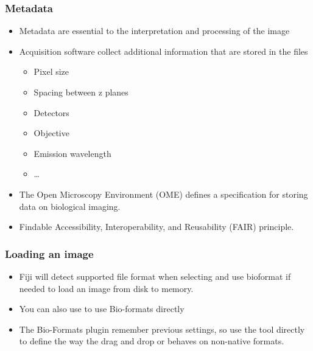 \documentclass[ignorenonframetext,aspectratio=169,10pt,xcolor=table]{beamer}
\begin{document}
\begin{frame} \frametitle{Metadata}
  \begin {itemize}
  \item Metadata are essential to the interpretation and processing of
    the image
  \item Acquisition software collect additional information that are
    stored in the files
    \begin{itemize}
    \item Pixel size
    \item Spacing between z planes
    \item Detectors
    \item Objective
    \item Emission wavelength
    \item \dots
    \end{itemize}
  \item The Open Microscopy Environment (OME) defines a specification
    for storing data on biological imaging.
  \item Findable Accessibility, Interoperability, and Reusability
    (FAIR) principle.
  \end{itemize} 
\end{frame}

\begin{frame} \frametitle{Loading an image}
  \begin{itemize}
  \item Fiji will detect supported file format when selecting
     and use bioformat if needed to load an image from
    disk to memory.
  \item You can also use  to use Bio-formats directly
  \item The Bio-Formats plugin remember previous settings, so use
    the tool directly to define the way the drag and drop or
     behaves on non-native formats.
  \end{itemize}
\end{frame}
\end{document}
